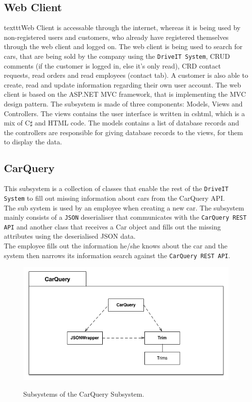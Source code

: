 \subsection{Web Client}
\The texttt{Web Client} is accessable through the internet, whereas it is being used by non-registered users and customers, who already have registered themselves through the web client and logged on. The web client is being used to search for cars, that are being sold by the company using the \texttt{DriveIT System}, CRUD comments (if the customer is logged in, else it's only read), CRD contact requests, read orders and read employees (contact tab). A customer is also able to create, read and update information regarding their own user account.
The web client is based on the ASP.NET MVC framework, that is implementing the MVC design pattern. The subsystem is made of three components: Models, Views and Controllers. The views contains the user interface is written in cshtml, which is a mix of C$\sharp$ and HTML code. The models contains a list of database records and the controllers are responsible for giving database records to the views, for them to display the data.

\subsection{CarQuery} 
This subsystem is a collection of classes that enable the rest of the \texttt{DriveIT System} to fill out missing information about cars from the CarQuery API.\\
The sub system is used by an employee when creating a new car. The subsystem mainly consists of a \texttt{JSON} deserialiser that communicates with the \texttt{CarQuery REST API} and another class that receives a Car object and fills out the missing attributes using the deserialised JSON data. \\
The employee fills out the information he/she knows about the car and the system then narrows its information search against the \texttt{CarQuery REST API}.
\begin{figure}[H]
	\centering
	\includegraphics[scale=0.60]{Figures/CarQuerySubsystemDecomposition}\\
	\caption{Subsystems of the CarQuery Subsystem.}
\end{figure}